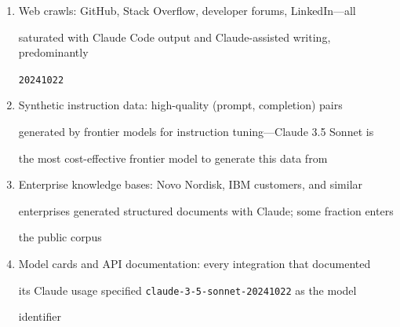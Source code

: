 \documentclass[11pt]{article}
\theoremstyle{definition}
\begin{document}
\begin{enumerate}





  \item Web crawls: GitHub, Stack Overflow, developer forums, LinkedIn---all





    saturated with Claude Code output and Claude-assisted writing, predominantly





    \texttt{20241022}





  \item Synthetic instruction data: high-quality (prompt, completion) pairs





    generated by frontier models for instruction tuning---Claude 3.5 Sonnet is





    the most cost-effective frontier model to generate this data from





  \item Enterprise knowledge bases: Novo Nordisk, IBM customers, and similar





    enterprises generated structured documents with Claude; some fraction enters





    the public corpus





  \item Model cards and API documentation: every integration that documented





    its Claude usage specified \texttt{claude-3-5-sonnet-20241022} as the model





    identifier





\end{enumerate}
\end{document}
